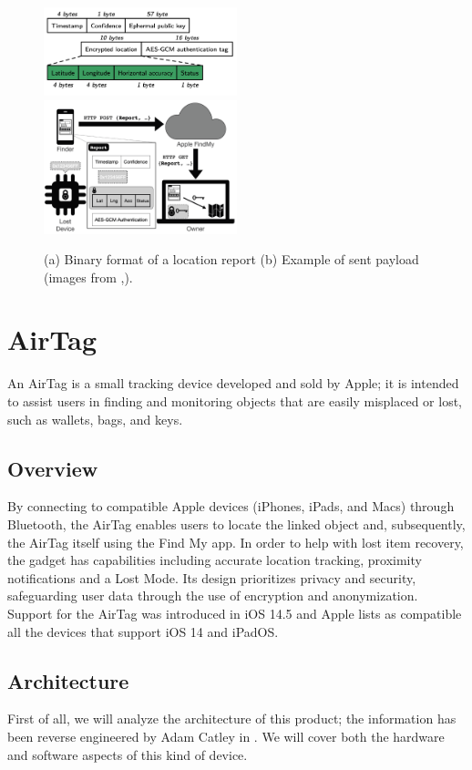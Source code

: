 \documentclass[english]{article}
\begin{document}
\begin{figure}
	\centering
	\includegraphics[width=0.5\textwidth]{images/packet.png}\hfill 
	\includegraphics[width=0.5\textwidth]{images/findmysec.png}
	\caption{(a) Binary format of a location report \quad (b) Example of sent payload (images from \cite{whocanfind},\cite{airguard}).}
	\label{comparison}
\end{figure}


\section{AirTag}\label{sec:at}
An AirTag is a small tracking device developed and sold by Apple; it is intended to assist users in finding and monitoring objects that are easily misplaced or lost, such as wallets, bags, and keys.
\subsection{Overview}
 By connecting to compatible Apple devices (iPhones, iPads, and Macs) through Bluetooth, the AirTag enables users to locate the linked object and, subsequently, the AirTag itself using the Find My app. In order to help with lost item recovery, the gadget has capabilities including accurate location tracking, proximity notifications and a Lost Mode. Its design prioritizes privacy and security, safeguarding user data through the use of encryption and anonymization. Support for the AirTag was introduced in iOS 14.5 and Apple lists as compatible all the devices that support iOS 14 and iPadOS.
\subsection{Architecture}
First of all, we will analyze the architecture of this product; the information has been reverse engineered by Adam Catley in \cite{reverse}. We will cover both the hardware and software aspects of this kind of device.
\end{document}
